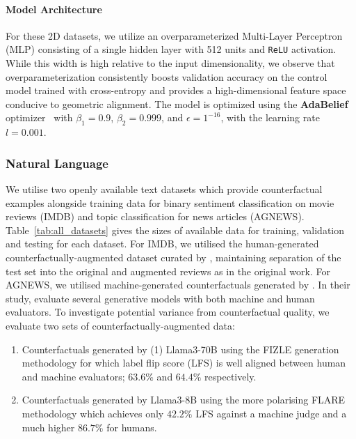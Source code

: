 \paragraph{Model Architecture} For these 2D datasets, we utilize an overparameterized Multi-Layer Perceptron (MLP) consisting of a single hidden layer with 512 units and \texttt{ReLU} activation. While this width is high relative to the input dimensionality, we observe that overparameterization consistently boosts validation accuracy on the control model trained with cross-entropy and provides a high-dimensional feature space conducive to geometric alignment. The model is optimized using the \textbf{AdaBelief} optimizer~\citep{zhuang2020adabeliefoptimizeradaptingstepsizes} with $\beta_1{=}0.9$, $\beta_2{=}0.999$, and $\epsilon{=}1^{-16}$, with the learning rate $l = 0.001$.

\subsubsection{Natural Language}
We utilise two openly available text datasets which provide counterfactual examples alongside training data for binary sentiment classification on movie reviews (IMDB) and topic classification for news articles (AGNEWS). Table~\ref{tab:all_datasets} gives the sizes of available data for training, validation and testing for each dataset. For IMDB, we utilised the human-generated counterfactually-augmented dataset curated by \citet{Kaushik2020Learning}, maintaining separation of the test set into the original and augmented reviews as in the original work\cite{Kaushik2020Learning}. For AGNEWS, we utilised machine-generated counterfactuals generated by \citet{wang2025truthtwistoptimalmodel}. In their study, \citet{wang2025truthtwistoptimalmodel} evaluate several generative models with both machine and human evaluators. To investigate potential variance from counterfactual quality, we evaluate two sets of counterfactually-augmented data:
\begin{enumerate}
    \item Counterfactuals generated by (1) Llama3-70B using the FIZLE generation methodology\cite{FIZLE} for which label flip score (LFS) is well aligned between human and machine evaluators; $63.6\%$ and $64.4\%$ respectively.
    \item Counterfactuals generated by Llama3-8B using the more polarising FLARE methodology \cite{FLARE} which achieves only $42.2\%$ LFS against a machine judge and a much higher $86.7\%$ for humans.
\end{enumerate}


